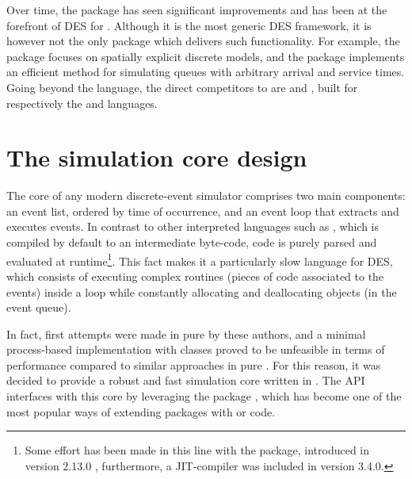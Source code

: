 \documentclass[
  nojss]{jss}
\begin{document}
Over time, the  package has seen significant improvements
and has been at the forefront of DES for . Although it is
the most generic DES framework, it is however not the only 
package which delivers such functionality. For example, the 
package \citep{CRAN:SpaDES} focuses on spatially explicit discrete
models, and the  package
\citep{CRAN:queuecomputer, arxiv:queuecomputer} implements an efficient
method for simulating queues with arbitrary arrival and service times.
Going beyond the  language, the direct competitors to
 are  \citep{SimPy} and 
\citep{GitHub:SimJulia}, built for respectively the 
and  languages.

\section{The simulation core design}\label{the-simulation-core-design}

The core of any modern discrete-event simulator comprises two main
components: an event list, ordered by time of occurrence, and an event
loop that extracts and executes events. In contrast to other interpreted
languages such as , which is compiled by default to an
intermediate byte-code,  code is purely parsed and evaluated
at runtime\footnote{Some effort has been made in this line with the
   package, introduced in  version 2.13.0
  \citep{R:compiler}, furthermore, a JIT-compiler was included in
   version 3.4.0.}. This fact makes it a particularly slow
language for DES, which consists of executing complex routines (pieces
of code associated to the events) inside a loop while constantly
allocating and deallocating objects (in the event queue).

In fact, first attempts were made in pure  by these authors,
and a minimal process-based implementation with  classes
\citep{CRAN:R6} proved to be unfeasible in terms of performance compared
to similar approaches in pure . For this reason, it was
decided to provide a robust and fast simulation core written in
. The  API interfaces with this 
core by leveraging the  package
\citep{Eddelbuettel:2011:Rcpp, Eddelbuettel:2013:Rcpp}, which has become
one of the most popular ways of extending  packages with
 or  code.
\end{document}
